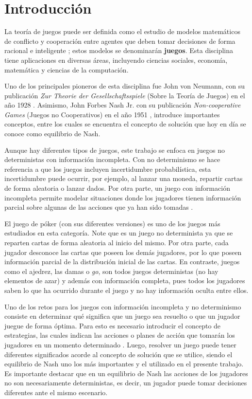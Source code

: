 \chapter*{Introducción}

La teoría de juegos puede ser definida como el estudio de modelos matemáticos de conflicto y cooperación entre agentes que deben tomar decisiones de forma racional e inteligente \cite[p.~1]{bib:game-theory-book}; estos modelos se denominarán \textbf{juegos}. Esta disciplina tiene aplicaciones en diversas áreas, incluyendo ciencias sociales, economía, matemática y ciencias de la computación.

Uno de los principales pioneros de esta disciplina fue John von Neumann, con su publicación \textit{Zur Theorie der Gesellschaftsspiele} (Sobre la Teoría de Juegos) en el año 1928 \cite{bib:von-neumann}. Asimismo, John Forbes Nash Jr. con su publicación \textit{Non-cooperative Games} (Juegos no Cooperativos) en el año 1951 \cite{bib:nash}, introduce importantes conceptos, entre los cuales se encuentra el concepto de solución que hoy en día se conoce como equilibrio de Nash.

Aunque hay diferentes tipos de juegos, este trabajo se enfoca en juegos no deterministas con información incompleta. Con no determinismo se hace referencia a que los juegos incluyen incertidumbre probabilística, esta incertidumbre puede ocurrir, por ejemplo, al lanzar una moneda, repartir cartas de forma aleatoria o lanzar dados. Por otra parte, un juego con información incompleta permite modelar situaciones donde los jugadores tienen información parcial sobre algunas de las acciones que ya han sido tomadas \cite[p.~199]{bib:course-game-theory}.

El juego de póker (con sus diferentes versiones) es uno de los juegos más estudiados en esta categoría. Note que es un juego no determinista ya que se reparten cartas de forma aleatoria al inicio del mismo. Por otra parte, cada jugador desconoce las cartas que poseen los demás jugadores, por lo que poseen información parcial de la distribución inicial de las cartas. En contraste, juegos como el ajedrez, las damas o \textit{go}, son todos juegos deterministas (no hay elementos de azar) y además con información completa, pues todos los jugadores saben lo que ha ocurrido durante el juego y no hay información oculta entre ellos.

Uno de los retos para los juegos con información incompleta y no determinismo consiste en determinar qué significa que un juego sea resuelto o que un jugador juegue de forma óptima. Para esto es necesario introducir el concepto de estrategias, las cuales indican las acciones o planes de acción que tomarán los jugadores en un momento determinado \cite[p.~24]{bib:teoria-juegos-es}. Luego, resolver un juego puede tener diferentes significados acorde al concepto de solución que se utilice, siendo el equilibrio de Nash uno los más importantes y el utilizado en el presente trabajo. Es importante destacar que en un equilibrio de Nash las acciones de los jugadores no son necesariamente deterministas, es decir, un jugador puede tomar decisiones diferentes ante el mismo escenario.

